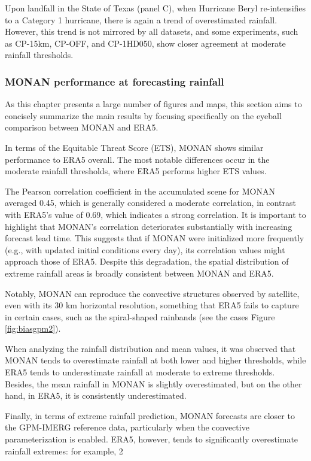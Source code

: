 Upon landfall in the State of Texas (panel C), when Hurricane Beryl re-intensifies to a Category 1 hurricane, there is again a trend of overestimated rainfall. However, this trend is not mirrored by all datasets, and some experiments, such as CP-15km, CP-OFF, and CP-1HD050, show closer agreement at moderate rainfall thresholds.

\subsubsection{MONAN performance at forecasting rainfall}

As this chapter presents a large number of figures and maps, this section aims to concisely summarize the main results by focusing specifically on the eyeball comparison between MONAN and ERA5.

In terms of the Equitable Threat Score (ETS), MONAN shows similar performance to ERA5 overall. The most notable differences occur in the moderate rainfall thresholds, where ERA5 performs higher ETS values.

The Pearson correlation coefficient in the accumulated scene for MONAN averaged 0.45, which is generally considered a moderate correlation, in contrast with ERA5's value of 0.69, which indicates a strong correlation. It is important to highlight that MONAN's correlation deteriorates substantially with increasing forecast lead time. This suggests that if MONAN were initialized more frequently (e.g., with updated initial conditions every day), its correlation values might approach those of ERA5. Despite this degradation, the spatial distribution of extreme rainfall areas is broadly consistent between MONAN and ERA5.

Notably, MONAN can reproduce the convective structures observed by satellite, even with its 30 km horizontal resolution, something that ERA5 fails to capture in certain cases, such as the spiral-shaped rainbands (see the cases Figure \ref{fig:biasgpm2}).

When analyzing the rainfall distribution and mean values, it was observed that MONAN tends to overestimate rainfall at both lower and higher thresholds, while ERA5 tends to underestimate rainfall at moderate to extreme thresholds. Besides, the mean rainfall in MONAN is slightly overestimated, but on the other hand, in ERA5, it is consistently underestimated.

Finally, in terms of extreme rainfall prediction, MONAN forecasts are closer to the GPM-IMERG reference data, particularly when the convective parameterization is enabled. ERA5, however, tends to significantly overestimate rainfall extremes: for example, 2%

